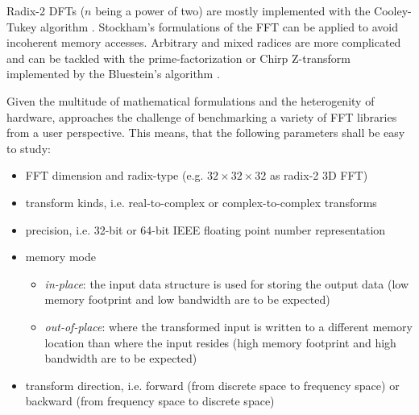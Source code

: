 Radix-2 DFTs ($n$ being a power of two) are mostly implemented with the Cooley-Tukey algorithm \cite{cooley1965algorithm}. Stockham's formulations of the FFT can be applied \cite{FFTW05} to avoid incoherent memory accesses. Arbitrary and mixed radices are more complicated and can be tackled with the prime-factorization or Chirp Z-transform implemented by the Bluestein's algorithm \cite{bluestein}. 

Given the multitude of mathematical formulations and the heterogenity of hardware, \gearshifft{} approaches the challenge of benchmarking a variety of FFT libraries from a user perspective. This means, that the following parameters shall be easy to study:

\begin{itemize}
\item FFT dimension and radix-type (e.g. $32{\times}32{\times}32$ as radix-2 3D FFT)
\item transform kinds, i.e. real-to-complex or complex-to-complex transforms
\item precision, i.e. 32-bit or 64-bit IEEE floating point number representation
\item memory mode
  \begin{itemize}
  \item \emph{in-place}: the input data structure is used for storing the output data (low memory footprint and low bandwidth are to be expected)
  \item \emph{out-of-place}:  where the transformed input is written to a different memory location than where the input resides (high memory footprint and high bandwidth are to be expected)
  \end{itemize}
\item transform direction, i.e. forward (from discrete space to frequency space) or backward (from frequency space to discrete space)
\end{itemize}
 
